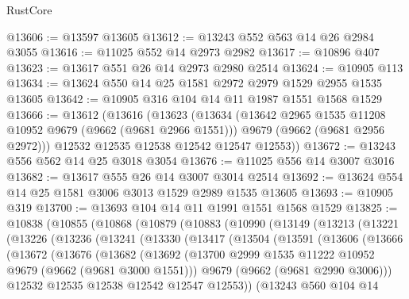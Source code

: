 \begin{lexlean}{RustCore}
\begin{coremodule}
@13606 := @13597 @13605
@13612 := @13243 @552 @563 @14 @26 @2984 @3055
@13616 := @11025 @552 @14 @2973 @2982
@13617 := @10896 @407
@13623 := @13617 @551 @26 @14 @2973 @2980 @2514
@13624 := @10905 @113
@13634 := @13624 @550 @14 @25 @1581 @2972 @2979 @1529 @2955 @1535 @13605
@13642 := @10905 @316 @104 @14 @11 @1987 @1551 @1568 @1529
@13666 := @13612
    (@13616
      (@13623
        (@13634
          (@13642 @2965 @1535 @11208 @10952 @9679 (@9662 (@9681 @2966 @1551)))
          @9679
          (@9662 (@9681 @2956 @2972)))
        @12532
        @12535
        @12538
        @12542
        @12547
        @12553))
@13672 := @13243 @556 @562 @14 @25 @3018 @3054
@13676 := @11025 @556 @14 @3007 @3016
@13682 := @13617 @555 @26 @14 @3007 @3014 @2514
@13692 := @13624 @554 @14 @25 @1581 @3006 @3013 @1529 @2989 @1535 @13605
@13693 := @10905 @319
@13700 := @13693 @104 @14 @11 @1991 @1551 @1568 @1529
@13825 := @10838
    (@10855
      (@10868
        (@10879
          (@10883
            (@10990
              (@13149
                (@13213
                  (@13221
                    (@13226
                      (@13236
                        (@13241
                          (@13330
                            (@13417
                              (@13504
                                (@13591
                                  (@13606
                                    (@13666
                                      (@13672
                                        (@13676
                                          (@13682
                                            (@13692
                                              (@13700
                                                @2999
                                                @1535
                                                @11222
                                                @10952
                                                @9679
                                                (@9662 (@9681 @3000 @1551)))
                                              @9679
                                              (@9662 (@9681 @2990 @3006)))
                                            @12532
                                            @12535
                                            @12538
                                            @12542
                                            @12547
                                            @12553))
                                        (@13243
                                          @560
                                          @104
                                          @14

\end{coremodule}
\end{lexlean}
